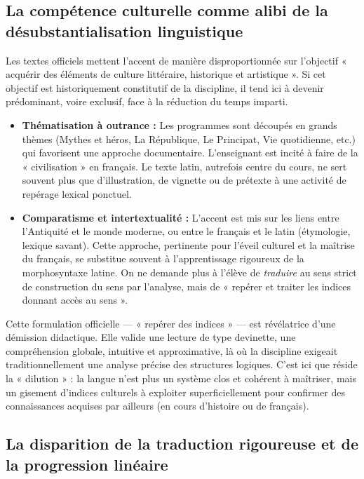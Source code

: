 \subsection{La compétence culturelle comme alibi de la désubstantialisation linguistique}

Les textes officiels mettent l'accent de manière disproportionnée sur l'objectif « acquérir des
éléments de culture littéraire, historique et artistique ».\cite{I-3-2-ref13} Si cet objectif est
historiquement constitutif de la discipline, il tend ici à devenir prédominant, voire exclusif, face
à la réduction du temps imparti.

\begin{itemize}\item \textbf{Thématisation à outrance :} Les programmes sont découpés en grands thèmes (Mythes et héros, La République, Le Principat, Vie quotidienne, etc.) qui favorisent une approche documentaire.\cite{I-3-2-ref14} L'enseignant est incité à faire de la « civilisation » en français. Le texte latin, autrefois centre du cours, ne sert souvent plus que d'illustration, de vignette ou de prétexte à une activité de repérage lexical ponctuel.\item \textbf{Comparatisme et intertextualité :} L'accent est mis sur les liens entre l'Antiquité et le monde moderne, ou entre le français et le latin (étymologie, lexique savant).\cite{I-3-2-ref16} Cette approche, pertinente pour l'éveil culturel et la maîtrise du français, se substitue souvent à l'apprentissage rigoureux de la morphosyntaxe latine. On ne demande plus à l'élève de \textit{traduire} au sens strict de construction du sens par l'analyse, mais de « repérer et traiter les indices donnant accès au sens ».\cite{I-3-2-ref13}\end{itemize}Cette formulation officielle — « repérer des indices » — est révélatrice d'une démission didactique.
Elle valide une lecture de type devinette, une compréhension globale, intuitive et approximative, là
où la discipline exigeait traditionnellement une analyse précise des structures logiques. C'est ici
que réside la « dilution » : la langue n'est plus un système clos et cohérent à maîtriser, mais un
gisement d'indices culturels à exploiter superficiellement pour confirmer des connaissances acquises
par ailleurs (en cours d'histoire ou de français).



\subsection{La disparition de la traduction rigoureuse et de la progression linéaire}


